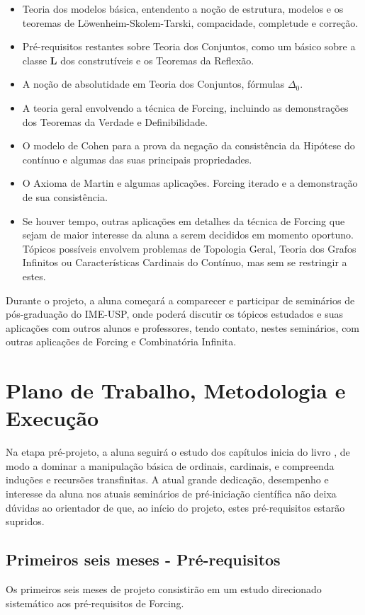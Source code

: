 \documentclass{article}
\begin{document}
    \begin{itemize}
        \item Teoria dos modelos básica, entendento a noção de estrutura, modelos e os teoremas de Löwenheim-Skolem-Tarski, compacidade, completude e correção.
        \item Pré-requisitos restantes sobre Teoria dos Conjuntos, como um básico sobre a classe $\mathbf{L}$ dos construtíveis e os Teoremas da Reflexão.
        \item A noção de absolutidade em Teoria dos Conjuntos, fórmulas $\Delta_0$.
        \item A teoria geral envolvendo a técnica de Forcing, incluindo as demonstrações dos Teoremas da Verdade e Definibilidade.
        \item O modelo de Cohen para a prova da negação da consistência da Hipótese do contínuo e algumas das suas principais propriedades.
        \item O Axioma de Martin e algumas aplicações. Forcing iterado e a demonstração de sua consistência.
        \item Se houver tempo, outras aplicações em detalhes da técnica de Forcing que sejam de maior interesse da aluna a serem decididos em momento oportuno. Tópicos possíveis envolvem problemas de Topologia Geral, Teoria dos Grafos Infinitos ou Características Cardinais do Contínuo, mas sem se restringir a estes.
    \end{itemize}

    Durante o projeto, a aluna começará a comparecer e participar de seminários de pós-graduação do IME-USP, onde poderá discutir os tópicos estudados e suas aplicações com outros alunos e professores, tendo contato, nestes seminários, com outras aplicações de Forcing e Combinatória Infinita.

\section{Plano de Trabalho, Metodologia e Execução}
    Na etapa pré-projeto, a aluna seguirá o estudo dos capítulos inicia do livro \cite{hrbacek2017introduction}, de modo a dominar a manipulação básica de ordinais, cardinais, e compreenda induções e recursões transfinitas. A atual grande dedicação, desempenho e interesse da aluna nos atuais seminários de pré-iniciação científica não deixa dúvidas ao orientador de que, ao início do projeto, estes pré-requisitos estarão supridos.

    \subsection{Primeiros seis meses - Pré-requisitos}
    Os primeiros seis meses de projeto consistirão em um estudo direcionado sistemático aos pré-requisitos de Forcing.
\end{document}
